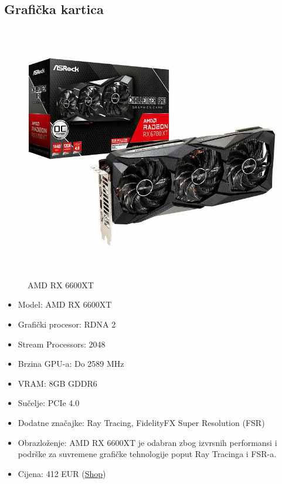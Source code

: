 \documentclass{article}
\begin{document}
\subsection{Grafička kartica}
\begin{figure}[H]
    \centering
    \includegraphics[width = \textwidth]{Slike/graficka.jpg}
    \caption{AMD RX 6600XT}
    \label{fig:Grafička kartica}
\end{figure}
\begin{itemize}
    \item Model: AMD RX 6600XT
    \item Grafički procesor: RDNA 2
    \item Stream Processors: 2048
    \item Brzina GPU-a: Do 2589 MHz
    \item VRAM: 8GB GDDR6
    \item Sučelje: PCIe 4.0
    \item Dodatne značajke: Ray Tracing, FidelityFX Super Resolution (FSR)
    \item Obrazloženje: AMD RX 6600XT je odabran zbog izvrsnih performansi i podrške za suvremene grafičke tehnologije poput Ray Tracinga i FSR-a.
    \item Cijena: 412 EUR (\href{https://tehno-mag.hr/graficka-kartica-msi-rx-6600-xt-8gb-mech-2x-oc-proizvod-8005/}{Shop})
\end{itemize}
\pagebreak
\end{document}
